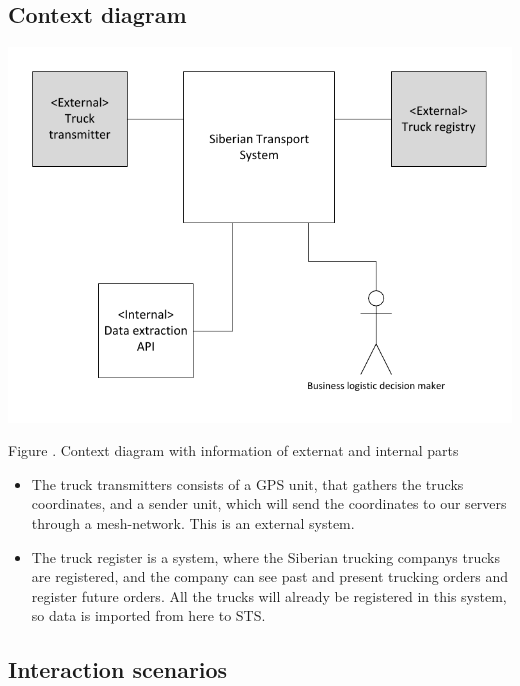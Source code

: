 \documentclass[a4paper,11pt]{report}
\newcommand{\mycaption}[1]{
  \addtocounter{figures}{1}
  Figure \arabic{figures}. #1
}
\begin{document}
\subsection{Context diagram}
\label{sec:context-diagram}

\begin{center}
  \includegraphics[width=\textwidth]{figures/sts_formal_context_diagram}\\
\end{center}
  \mycaption{Context diagram with information of externat and internal parts }

\begin{itemize}
\item The truck transmitters consists of a GPS unit, that gathers the trucks coordinates, and a sender unit, which will send the coordinates to our servers through a mesh-network. This is an external system.
\item The truck register is a system, where the Siberian trucking companys trucks are registered, and the company can see past and present trucking orders and register future orders. All the trucks will already be registered in this system, so data is imported from here to STS. 
\end{itemize}


\subsection{Interaction scenarios}
\label{sec:inter-scen}
\end{document}
